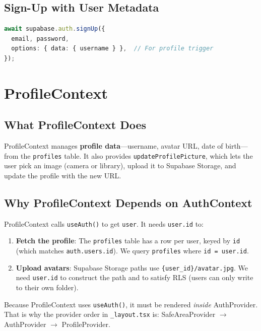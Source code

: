 \documentclass[11pt,a4paper]{article}
\begin{document}
\subsection{Sign-Up with User Metadata}

\begin{lstlisting}[language=TypeScript, caption=Sign-Up with Username in Metadata]
await supabase.auth.signUp({
  email, password,
  options: { data: { username } },  // For profile trigger
});
\end{lstlisting}

\section{ProfileContext}

\subsection{What ProfileContext Does}

ProfileContext manages \textbf{profile data}---username, avatar URL, date of birth---from the \texttt{profiles} table. It also provides \texttt{updateProfilePicture}, which lets the user pick an image (camera or library), upload it to Supabase Storage, and update the profile with the new URL.

\subsection{Why ProfileContext Depends on AuthContext}

ProfileContext calls \texttt{useAuth()} to get \texttt{user}. It needs \texttt{user.id} to:

\begin{enumerate}
    \item \textbf{Fetch the profile}: The \texttt{profiles} table has a row per user, keyed by \texttt{id} (which matches \texttt{auth.users.id}). We query \texttt{profiles} where \texttt{id = user.id}.
    \item \textbf{Upload avatars}: Supabase Storage paths use \texttt{\{user\_id\}/avatar.jpg}. We need \texttt{user.id} to construct the path and to satisfy RLS (users can only write to their own folder).
\end{enumerate}

Because ProfileContext uses \texttt{useAuth()}, it must be rendered \textit{inside} AuthProvider. That is why the provider order in \texttt{\_layout.tsx} is: SafeAreaProvider $\rightarrow$ AuthProvider $\rightarrow$ ProfileProvider.
\end{document}
